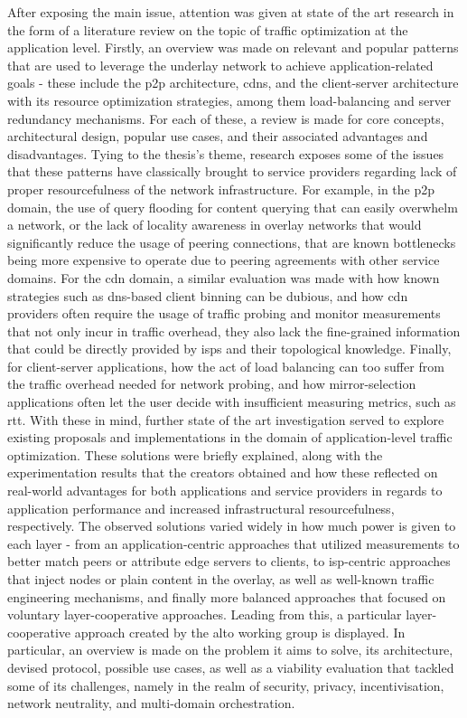     After exposing the main issue, attention was given at state of the art research in the form of a literature review on the topic of traffic optimization at the application level.
    Firstly, an overview was made on relevant and popular patterns that are used to leverage the underlay network to achieve application-related goals - these include the \gls{p2p} architecture, \glspl{cdn}, and the client-server architecture with its resource optimization strategies, among them load-balancing and server redundancy mechanisms.
    For each of these, a review is made for core concepts, architectural design, popular use cases, and their associated advantages and disadvantages. Tying to the thesis's theme, research exposes some of the issues that these patterns have classically brought to service providers regarding lack of proper resourcefulness of the network infrastructure.
    For example, in the \gls{p2p} domain, the use of query flooding for content querying that can easily overwhelm a network, or the lack of locality awareness in overlay networks that would significantly reduce the usage of peering connections, that are known bottlenecks being more expensive to operate due to peering agreements with other service domains.
    For the \gls{cdn} domain, a similar evaluation was made with how known strategies such as \gls{dns}-based client binning can be dubious, and how \gls{cdn} providers often require the usage of traffic probing and monitor measurements that not only incur in traffic overhead, they also lack the fine-grained information that could be directly provided by \glspl{isp} and their topological knowledge. 
    Finally, for client-server applications, how the act of load balancing can too suffer from the traffic overhead needed for network probing, and how mirror-selection applications often let the user decide with insufficient measuring metrics, such as \gls{rtt}.
    With these in mind, further state of the art investigation served to explore existing proposals and implementations in the domain of application-level traffic
optimization. 
    These solutions were briefly explained, along with the experimentation results that the creators obtained and how these reflected on real-world advantages for both applications and service providers in regards to application performance and increased infrastructural resourcefulness, respectively.
    The observed solutions varied widely in how much power is given to each layer - from an application-centric approaches that utilized measurements to better match peers or attribute edge servers to clients, to \gls{isp}-centric approaches that inject nodes or plain content in the overlay, as well as well-known traffic engineering mechanisms, and finally more balanced approaches that focused on voluntary layer-cooperative approaches.
    Leading from this, a particular layer-cooperative approach created by the \gls{alto} working group is displayed.
    In particular, an overview is made on the problem it aims to solve, its architecture, devised protocol, possible use cases, as well as a viability evaluation that tackled some of its challenges, namely in the realm of security, privacy, incentivisation, network neutrality, and multi-domain orchestration.

